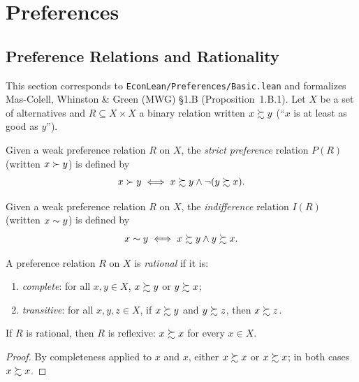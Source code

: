\chapter{Preferences}
\label{chap:preferences}

\section{Preference Relations and Rationality}
\label{sec:preferences}

This section corresponds to \texttt{EconLean/Preferences/Basic.lean} and formalizes
Mas-Colell, Whinston \& Green (MWG) \S1.B (Proposition~1.B.1). Let $X$ be a set of
alternatives and $R \subseteq X \times X$ a binary relation written $x \succsim y$
(``$x$ is at least as good as $y$'').

\begin{definition}
\label{def:P}
\leanok
Given a weak preference relation $R$ on $X$, the \emph{strict preference} relation
$P(R)$ (written $x \succ y$) is defined by
\[
  x \succ y \iff x \succsim y \land \neg(y \succsim x).
\]
\end{definition}

\begin{definition}[Indifference]
\label{def:I}
\leanok
Given a weak preference relation $R$ on $X$, the \emph{indifference} relation
$I(R)$ (written $x \sim y$) is defined by
\[
  x \sim y \iff x \succsim y \land y \succsim x.
\]
\end{definition}

\begin{definition}
\label{def:rational}
\leanok
A preference relation $R$ on $X$ is \emph{rational} if it is:
\begin{enumerate}
  \item \emph{complete}: for all $x, y \in X$, $x \succsim y$ or $y \succsim x$;
  \item \emph{transitive}: for all $x, y, z \in X$, if $x \succsim y$ and $y \succsim z$, then $x \succsim z$.
\end{enumerate}
\end{definition}

\begin{proposition}[Reflexivity]
\label{thm:refl}
\leanok
{}
If $R$ is rational, then $R$ is reflexive: $x \succsim x$ for every $x \in X$.
\end{proposition}
\begin{proof}
\leanok
By completeness applied to $x$ and $x$, either $x \succsim x$ or $x \succsim x$; in both cases $x \succsim x$.
\end{proof}

